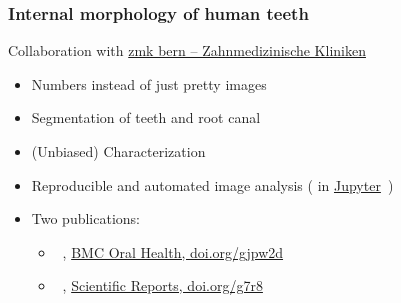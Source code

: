 \begin{frame}
	\frametitle{Internal morphology of human teeth}
	Collaboration with \href{https://www.zmk.unibe.ch/}{zmk bern – Zahnmedizinische Kliniken}
	\begin{itemize}
		\item Numbers instead of just pretty images
		\item Segmentation of teeth and root canal
		\item (Unbiased) Characterization
		\item Reproducible and automated image analysis (\href{https://www.python.org/}{\faPython} in \href{https://jupyter.org/}{Jupyter}~\cite{Kluyver2016})
		\item Two publications:
		\begin{itemize}
			\item ~\cite{Haberthur2021}, \href{https://bmcoralhealth.biomedcentral.com/articles/10.1186/s12903-021-01551-x}{BMC Oral Health, doi.org/gjpw2d}
			\item ~\cite{Wolf2021}, \href{https://www.nature.com/articles/s41598-021-00758-w}{Scientific Reports, doi.org/g7r8}
		\end{itemize}
	\end{itemize}
\end{frame}

